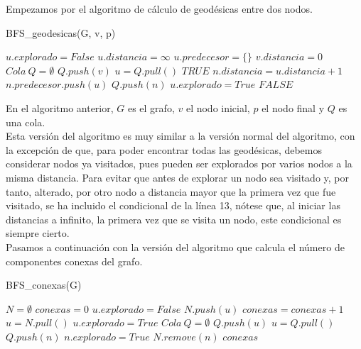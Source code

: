 Empezamos por el algoritmo de cálculo de geodésicas entre dos nodos.

\begin{algorithm}
	\caption{BFS\_geodesicas(G, v, p)}
	\begin{algorithmic}[1]
			\State $u.explorado = False$
			\State $u.distancia = \infty$
			\State $u.predecesor = \{\}$
		\EndFor
		\State $v.distancia = 0$
		\State $Cola\ Q = \emptyset$
		\State $Q.push(v)$
			\State $u = Q.pull()$
				\Return $TRUE$
			\EndIf
						\State $n.distancia = u.distancia + 1$
						\State $n.predecesor.push(u)$
						\State $Q.push(n)$
					\EndIf
				\EndIf
			\EndFor
			\State $u.explorado = True$
		\EndWhile
		\Return $FALSE$
	\end{algorithmic}
\end{algorithm}

En el algoritmo anterior, $G$ es el grafo, $v$ el nodo inicial, $p$ el nodo final y $Q$ es una cola. \\

Esta versión del algoritmo es muy similar a la versión normal del algoritmo, con la excepción de que, para poder encontrar todas las geodésicas, debemos considerar nodos ya visitados, pues pueden ser explorados por varios nodos a la misma distancia. Para evitar que antes de explorar un nodo sea visitado y, por tanto, alterado, por otro nodo a distancia mayor que la primera vez que fue visitado, se ha incluido el condicional de la línea 13, nótese que, al iniciar las distancias a infinito, la primera vez que se visita un nodo, este condicional es siempre cierto. \\

Pasamos a continuación con la versión del algoritmo que calcula el número de componentes conexas del grafo.

\begin{breakablealgorithm}
	\caption{BFS\_conexas(G)}
	\begin{algorithmic}[1]
		\State $N = \emptyset$
		\State $conexas = 0$
		\For{$u \in G.V$}
			\State $u.explorado = False$
			\State $N.push(u)$
		\EndFor
		\While{$N \neq \emptyset$}
			\State $conexas = conexas + 1$
			\State $u = N.pull()$
			\State $u.explorado = True$
			\State $Cola\ Q = \emptyset$
			\State $Q.push(u)$		
			\While{$Q \neq \emptyset$}
				\State $u = Q.pull()$
				\For{$n \in G.Adj[u]$}
					\If{$!n.explorado$}
						\State $Q.push(n)$
						\State $n.explorado = True$
						\State $N.remove(n)$
					\EndIf
				\EndFor
			\EndWhile
		\EndWhile
		\Return $conexas$
	\end{algorithmic}
\end{breakablealgorithm}

